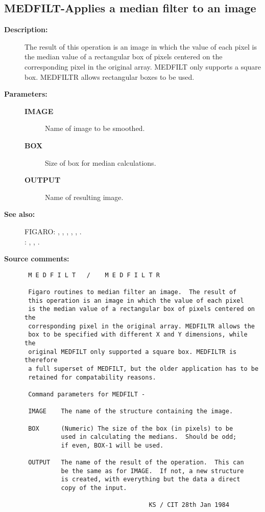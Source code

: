 \subsection{MEDFILT-\label{MEDFILT}Applies a median filter to an image}
\begin{description}

\item [{\bf Description:}]
 The result of this operation is an image in which the value of
 each pixel is the median value of a rectangular box of pixels
 centered on the corresponding pixel in the original array.
 MEDFILT only supports a square box.  MEDFILTR allows rectangular
 boxes to be used.

\item [{\bf Parameters:}]
\begin{description}
\item [{\bf IMAGE}]
 Name of image to be smoothed.
\item [{\bf BOX}]
 Size of box for median calculations.
\item [{\bf OUTPUT}]
 Name of resulting image.
\end{description}

\item [{\bf See also:}]
FIGARO: , , , , , .\\
: , , .\\

\item [{\bf Source comments:}]
\begin{verbatim}
 M E D F I L T   /    M E D F I L T R

 Figaro routines to median filter an image.  The result of
 this operation is an image in which the value of each pixel
 is the median value of a rectangular box of pixels centered on the
 corresponding pixel in the original array. MEDFILTR allows the
 box to be specified with different X and Y dimensions, while the
 original MEDFILT only supported a square box. MEDFILTR is therefore
 a full superset of MEDFILT, but the older application has to be
 retained for compatability reasons.

 Command parameters for MEDFILT -

 IMAGE    The name of the structure containing the image.

 BOX      (Numeric) The size of the box (in pixels) to be
          used in calculating the medians.  Should be odd;
          if even, BOX-1 will be used.

 OUTPUT   The name of the result of the operation.  This can
          be the same as for IMAGE.  If not, a new structure
          is created, with everything but the data a direct
          copy of the input.

                                  KS / CIT 28th Jan 1984
\end{verbatim}
\end{description}
